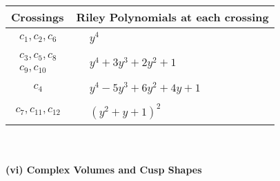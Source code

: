 \documentclass[1p]{elsarticle_modified}
\theoremstyle{definition}
\begin{document}
\begin{tabular}{m{50pt}|m{274pt}}
Crossings & \hspace{64pt}Riley Polynomials at each crossing \\
\hline $$\begin{aligned}c_{1},c_{2},c_{6}\end{aligned}$$&$\begin{aligned}
&y^4
\end{aligned}$\\
\hline $$\begin{aligned}c_{3},c_{5},c_{8}\\c_{9},c_{10}\end{aligned}$$&$\begin{aligned}
&y^4+3 y^3+2 y^2+1
\end{aligned}$\\
\hline $$\begin{aligned}c_{4}\end{aligned}$$&$\begin{aligned}
&y^4-5 y^3+6 y^2+4 y+1
\end{aligned}$\\
\hline $$\begin{aligned}c_{7},c_{11},c_{12}\end{aligned}$$&$\begin{aligned}
&(y^2+y+1)^2
\end{aligned}$\\
\hline
\end{tabular}\\~\\
\newpage\flushleft \textbf{(vi) Complex Volumes and Cusp Shapes}
\end{document}
